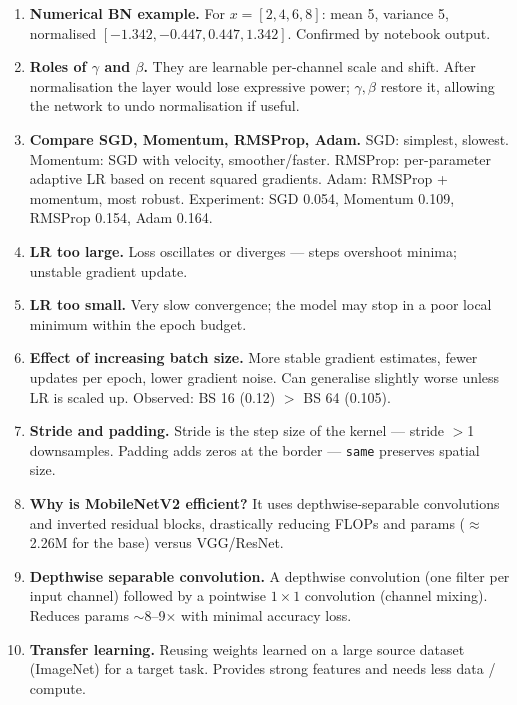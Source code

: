 \documentclass[10pt]{article}
\begin{document}
\begin{enumerate}
\item \textbf{Numerical BN example.} For $x=[2,4,6,8]$: mean 5, variance 5, normalised $[-1.342,-0.447,0.447,1.342]$. Confirmed by notebook output.

\item \textbf{Roles of $\gamma$ and $\beta$.} They are learnable per-channel scale and shift. After normalisation the layer would lose expressive power; $\gamma,\beta$ restore it, allowing the network to undo normalisation if useful.

\item \textbf{Compare SGD, Momentum, RMSProp, Adam.} SGD: simplest, slowest. Momentum: SGD with velocity, smoother/faster. RMSProp: per-parameter adaptive LR based on recent squared gradients. Adam: RMSProp + momentum, most robust. Experiment: SGD 0.054, Momentum 0.109, RMSProp 0.154, Adam 0.164.

\item \textbf{LR too large.} Loss oscillates or diverges --- steps overshoot minima; unstable gradient update.

\item \textbf{LR too small.} Very slow convergence; the model may stop in a poor local minimum within the epoch budget.

\item \textbf{Effect of increasing batch size.} More stable gradient estimates, fewer updates per epoch, lower gradient noise. Can generalise slightly worse unless LR is scaled up. Observed: BS 16 (0.12) $>$ BS 64 (0.105).

\item \textbf{Stride and padding.} Stride is the step size of the kernel --- stride $>$1 downsamples. Padding adds zeros at the border --- \texttt{same} preserves spatial size.

\item \textbf{Why is MobileNetV2 efficient?} It uses depthwise-separable convolutions and inverted residual blocks, drastically reducing FLOPs and params ($\approx$2.26M for the base) versus VGG/ResNet.

\item \textbf{Depthwise separable convolution.} A depthwise convolution (one filter per input channel) followed by a pointwise $1\times1$ convolution (channel mixing). Reduces params $\sim$8--9$\times$ with minimal accuracy loss.

\item \textbf{Transfer learning.} Reusing weights learned on a large source dataset (ImageNet) for a target task. Provides strong features and needs less data / compute.


\end{enumerate}
\end{document}
